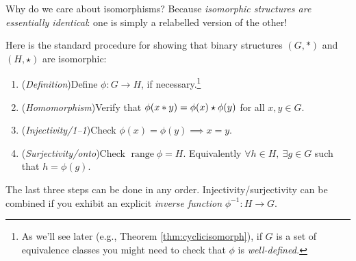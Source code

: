 Why do we care about isomorphisms? Because \emph{isomorphic structures are essentially identical}: one is simply a relabelled version of the other!\medbreak


Here is the standard procedure for showing that binary structures $(G,*)$ and $(H,\star)$ are isomorphic:
\begin{enumerate}\itemsep2pt
	\item (\emph{Definition})\lstsp Define $\phi:G\to H$, if necessary.\footnote{As we'll see later (e.g., Theorem \ref{thm:cyclicisomorph}), if $G$ is a set of equivalence classes you might need to check that $\phi$ is \emph{well-defined.}}
	\item (\emph{Homomorphism})\lstsp Verify that $\phi(x\mathbin{\ast} y)=\phi(x)\mathbin{\star}\phi(y)$ for all $x,y\in G$.
	\item (\emph{Injectivity/1--1})\lstsp Check $\phi(x)=\phi(y)\implies x=y$.
	\item (\emph{Surjectivity/onto})\lstsp Check $\operatorname{range}\phi=H$. Equivalently $\forall h\in H,\ \exists g\in G$ such that $h=\phi(g)$.
\end{enumerate}

The last three steps can be done in any order. Injectivity/surjectivity can be combined if you exhibit an explicit \emph{inverse function} $\phi^{-1}:H\to G$.


\goodbreak


